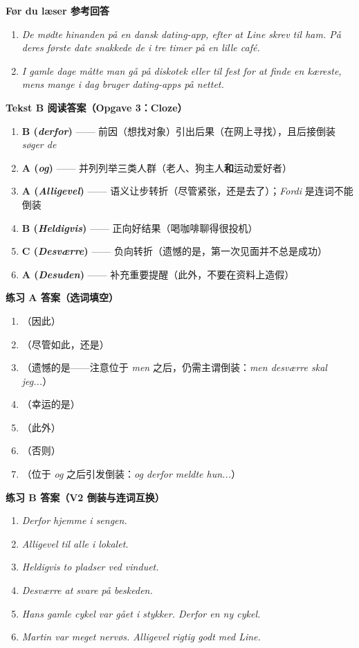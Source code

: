 \begin{answerbox}
\textbf{Før du læser 参考回答}
\begin{enumerate}
  \item \textit{De mødte hinanden på en dansk dating-app, efter at Line skrev til ham. På deres første date snakkede de i tre timer på en lille café.}
  \item \textit{I gamle dage måtte man gå på diskotek eller til fest for at finde en kæreste, mens mange i dag bruger dating-apps på nettet.}
\end{enumerate}

\textbf{Tekst B 阅读答案（Opgave 3：Cloze）}
\begin{enumerate}
  \item \textbf{B (\textit{derfor})} —— 前因（想找对象）引出后果（在网上寻找），且后接倒装 \textit{søger de}
  \item \textbf{A (\textit{og})} —— 并列列举三类人群（老人、狗主人\textbf{和}运动爱好者）
  \item \textbf{A (\textit{Alligevel})} —— 语义让步转折（尽管紧张，还是去了）；\textit{Fordi} 是连词不能倒装
  \item \textbf{B (\textit{Heldigvis})} —— 正向好结果（喝咖啡聊得很投机）
  \item \textbf{C (\textit{Desværre})} —— 负向转折（遗憾的是，第一次见面并不总是成功）
  \item \textbf{A (\textit{Desuden})} —— 补充重要提醒（此外，不要在资料上造假）
\end{enumerate}

\textbf{练习 A 答案（选词填空）}
\begin{enumerate}
  \item {}（因此）
  \item {}（尽管如此，还是）
  \item {}（遗憾的是——注意位于 \textit{men} 之后，仍需主谓倒装：\textit{men desværre skal jeg...}）
  \item {}（幸运的是）
  \item {}（此外）
  \item {}（否则）
  \item {}（位于 \textit{og} 之后引发倒装：\textit{og derfor meldte hun...}）
\end{enumerate}

\textbf{练习 B 答案（V2 倒装与连词互换）}
\begin{enumerate}
  \item \textit{Derfor  hjemme i sengen.}
  \item \textit{Alligevel  til alle i lokalet.}
  \item \textit{Heldigvis  to pladser ved vinduet.}
  \item \textit{Desværre  at svare på beskeden.}
  \item \textit{Hans gamle cykel var gået i stykker. Derfor  en ny cykel.}
  \item \textit{Martin var meget nervøs. Alligevel  rigtig godt med Line.}
\end{enumerate}


\end{answerbox}
